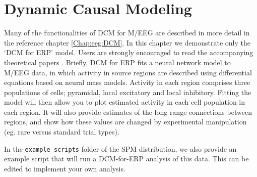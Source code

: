 \section{Dynamic Causal Modeling}

 Many of the functionalities of DCM for M/EEG are described in more detail in the reference chapter \ref{Chap:eeg:DCM}. In this chapter we demonstrate only the `DCM for ERP' model. 
 Users are strongly encouraged to read the accompanying theoretical papers \cite{od_dcm_erp,sjk_dcm_erp}. Briefly, DCM for ERP fits a  neural network model to M/EEG data, in which activity in source regions are described using differential equations based on neural mass models. Activity in each region comprises three populations of cells; pyramidal, local excitatory and local inhibitory. Fitting the model will then allow you to plot estimated activity in each cell population in each region. It will also provide estimates of the long range connections between regions, and show how these values are changed by experimental manipulation (eg. rare versus standard trial types).
  
  In the  \texttt{example\_scripts} folder of the SPM distribution, we also provide an example script that will run a DCM-for-ERP analysis of this data. This can be edited to implement your own analysis.

